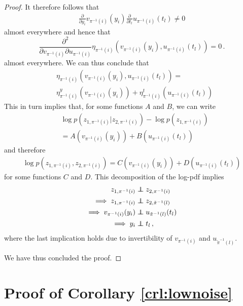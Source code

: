 \begin{proof}
	It therefore follows that
	\begin{align*}
	\frac{\partial}{\partial y_i}v_{\pi^{-1}(i)}(y_i) \frac{\partial }{\partial t_l} u_{\pi^{-1}(i)}(t_l) \neq 0
	\end{align*}
	almost everywhere and hence that
	\begin{equation}
	\frac{\partial^2}{\partial v_{\pi^{-1}(i)} \partial u_{\pi^{-1}(i)}} \eta_{\pi^{-1}(i)}(v_{\pi^{-1}(i)}(y_i), u_{\pi^{-1}(i)}(t_l)) = 0\,. \label{eq:additive_eta}
	\end{equation}
	almost everywhere.
	We can thus conclude that
	\begin{align*}
	&\eta_{\pi^{-1}(i)}(v_{\pi^{-1}(i)}(y_i), u_{\pi^{-1}(i)}(t_l)) = \\ &\eta_{\pi^{-1}(i)}^y(v_{\pi^{-1}(i)}(y_i))+ \eta_{\pi^{-1}(i)}^t(u_{\pi^{-1}(i)}(t_l))
	\end{align*}
	This in turn implies that, for some functions $A$ and $B$, we can write
	\begin{align*}
	&\log p(z_{1, \pi^{-1}(i)}|z_{2, \pi^{-1}(i)}) - \log p(z_{1, \pi^{-1}(i)}) \\ &= A(v_{\pi^{-1}(i)}(y_i)) + B(u_{\pi^{-1}(i)}(t_l))
	\end{align*}
	and therefore
	\begin{align*}
	\log p(z_{1, \pi^{-1}(i)},z_{2, \pi^{-1}(i)}) = C(v_{\pi^{-1}(i)}(y_i)) + D(u_{\pi^{-1}(i)}(t_l))
	\end{align*}
	for some functions $C$ and $D$. This decomposition of the log-pdf implies
	\begin{align*}
	z_{1, \pi^{-1}(i)} &\independent z_{2, \pi^{-1}(i)}\\
	\implies z_{1, \pi^{-1}(i)} &\independent z_{2, \tilde{\pi}^{-1}(l)}  \\
	\implies v_{\pi^{-1}(i)}(y_i)  &\independent u_{\tilde{\pi}^{-1}(l)}(t_l) \\
	\implies y_i  &\independent t_l \,,
	\end{align*}
	where the last implication holds due to invertibility of $v_{\pi^{-1}(i)}$ and $u_{\tilde{\pi}^{-1}(l)}$.
	
	We have thus concluded the proof.
	
\end{proof}

\section{Proof of Corollary \ref{crl:lownoise}}
\label{appendix:thm2}


